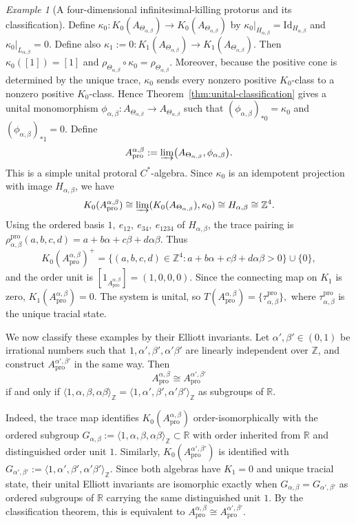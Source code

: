 \documentclass[11pt]{amsart}
\theoremstyle{definition}
\theoremstyle{remark}
\newtheorem{example}[theorem]{Example}
\newcommand{\Z}{\mathbb{Z}}
\newcommand{\R}{\mathbb{R}}
\newcommand{\id}{\mathrm{Id}}
\newcommand{\ex}{\mathrm{pro}}
\begin{document}
\begin{example}[A four-dimensional infinitesimal-killing protorus and its classification]
Define $\kappa_0\colon K_0(A_{\Theta_{\alpha,\beta}})
\longrightarrow
K_0(A_{\Theta_{\alpha,\beta}})$
by $\kappa_0|_{H_{\alpha,\beta}}=\id_{H_{\alpha,\beta}}$ and
$\kappa_0|_{L_{\alpha,\beta}}=0.$
Define also $\kappa_1:=0\colon
K_1(A_{\Theta_{\alpha,\beta}})
\longrightarrow
K_1(A_{\Theta_{\alpha,\beta}}).$
Then $
\kappa_0([1])=[1]$ and $\rho_{\Theta_{\alpha,\beta}}\circ\kappa_0
=
\rho_{\Theta_{\alpha,\beta}}.$
Moreover, because the positive cone is determined by the unique trace,
$\kappa_0$ sends every nonzero positive $K_0$-class to a nonzero positive
$K_0$-class. Hence Theorem~\ref{thm:unital-classification} gives a unital monomorphism $\phi_{\alpha,\beta}
\colon
A_{\Theta_{\alpha,\beta}}
\longrightarrow
A_{\Theta_{\alpha,\beta}}$
such that $
(\phi_{\alpha,\beta})_{*0}=\kappa_0$ and
$(\phi_{\alpha,\beta})_{*1}=0.$ Define
\[
A_{\ex}^{\alpha,\beta}
:=
\varinjlim
\bigl(A_{\Theta_{\alpha,\beta}},\phi_{\alpha,\beta}\bigr).
\]
This is a simple unital protoral \(C^*\)-algebra. Since \(\kappa_0\) is an
idempotent projection with image \(H_{\alpha,\beta}\), we have
\[
K_0(A_{\ex}^{\alpha,\beta})
\cong
\varinjlim(K_0(A_{\Theta_{\alpha,\beta}}),\kappa_0)
\cong
H_{\alpha,\beta}
\cong
\Z^4.
\]
Using the ordered basis $1,\ e_{12},\ e_{34},\ e_{1234}$
of $H_{\alpha,\beta}$, the trace pairing is $\rho_{\alpha,\beta}^{\ex}(a,b,c,d)
=a+b\alpha+c\beta+d\alpha\beta.$
Thus
\[
K_0(A_{\ex}^{\alpha,\beta})^+
=
\{(a,b,c,d)\in\Z^4:
a+b\alpha+c\beta+d\alpha\beta>0\}\cup\{0\},
\]
and the order unit is
$[1_{A_{\ex}^{\alpha,\beta}}]=(1,0,0,0).$
Since the connecting map on \(K_1\) is zero, $K_1(A_{\ex}^{\alpha,\beta})=0$. The system is unital, so $T(A_{\ex}^{\alpha,\beta})=\{\tau_{\alpha,\beta}^{\ex}\},$
where $\tau_{\alpha,\beta}^{\ex}$ is the unique tracial state.

We now classify these examples by their Elliott invariants. Let $\alpha',\beta'\in(0,1)$
be irrational numbers such that $1,\alpha',\beta',\alpha'\beta'$
are linearly independent over $\Z$, and construct
$A_{\ex}^{\alpha',\beta'}$ in the same way. Then
\[
A_{\ex}^{\alpha,\beta}
\cong
A_{\ex}^{\alpha',\beta'}
\]
if and only if $\langle 1,\alpha,\beta,\alpha\beta\rangle_{\Z}
=
\langle 1,\alpha',\beta',\alpha'\beta'\rangle_{\Z}$
as subgroups of $\R$.

Indeed, the trace map identifies $K_0(A_{\ex}^{\alpha,\beta})$
order-isomorphically with the ordered subgroup $G_{\alpha,\beta}:=
\langle 1,\alpha,\beta,\alpha\beta\rangle_{\Z}\subset\R$
with order inherited from $\R$ and distinguished order unit $1$. Similarly, $K_0(A_{\ex}^{\alpha',\beta'})$
is identified with $G_{\alpha',\beta'}:=\langle 1,\alpha',\beta',\alpha'\beta'\rangle_{\Z}.$
Since both algebras have $K_1=0$ and unique tracial state, their unital
Elliott invariants are isomorphic exactly when
$G_{\alpha,\beta}=G_{\alpha',\beta'}$
as ordered subgroups of $\R$ carrying the same distinguished unit $1$.
By the classification theorem, this is equivalent to $A_{\ex}^{\alpha,\beta}
\cong
A_{\ex}^{\alpha',\beta'}.$


\end{example}
\end{document}
